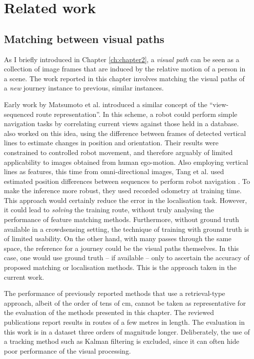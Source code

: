 \section{Related work}
\label{sec:retrieval}

\subsection{Matching between visual paths} 
\label{subsec:early_works}
 
As I briefly introduced in Chapter \ref{ch:chapter2}, a \textit{visual path} can be seen as a collection of image frames that are induced by the relative motion of a person in a scene. The work reported in this chapter involves matching the visual paths of a \textit{new} journey instance to previous, similar instances. 

Early work by Matsumoto et al. \cite{Matsumoto1996} introduced a similar concept of the ``view-sequenced route representation''.  In this scheme,  a robot could perform simple navigation tasks by correlating current views against those held in a database. \citet{Ohno1996} also worked on this idea, using the difference between frames of detected vertical lines to estimate changes in position and orientation. Their results were constrained to controlled robot movement, and therefore arguably of limited applicability to images obtained from human ego-motion. Also employing vertical lines as features, this time from omni-directional images, Tang et al. used estimated position differences between sequences to perform  robot navigation \cite{Tang2001}. To make the inference more robust, they used recorded odometry at training time. This approach would certainly reduce the error in the localisation task. However, it could lead to \textit{solving} the training  route, without truly analysing the performance of feature matching methods. Furthermore, without ground truth available in a crowdsensing setting, the technique of training with ground truth is of limited usability.  On the other hand, with many passes through the same space, the reference for a journey could be the visual paths themselves. In this case, one would use ground truth -- if available -- only to ascertain the accuracy of proposed matching or localisation methods. This is the approach taken in the current work.

The performance of previously reported methods that use a retrieval-type approach, albeit of the order of tens of cm, cannot be taken as representative for the evaluation of the methods presented in this chapter. The reviewed publications report results in routes of a few metres in length. The evaluation in this work is in a dataset three orders of magnitude longer.  Deliberately, the use of a tracking method such as Kalman filtering is excluded, since it can often hide poor performance of the visual processing. 

